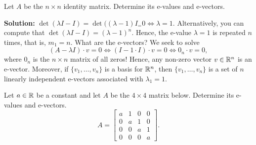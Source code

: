 \begin{example}
\label{ex:Eigen03} Let $A$ be the $n \times n$ identity matrix. Determine its e-values and e-vectors.
\end{example}

\textbf{Solution:} $\det(\lambda I - I)=\det((\lambda-1)I_=0 \iff \lambda = 1.$ Alternatively, you can compute that $\det(\lambda I - I) = (\lambda -1)^n.$ Hence, the e-value $\lambda=1$ is repeated $n$ times, that is, $m_1=n$. What are the e-vectors? We seek to solve 
$$(A-\lambda I)\cdot v = 0 \iff (I - 1\cdot I) \cdot v = 0 \iff 0_n \cdot v=0, $$
where $0_n$ is the $n \times n$ matrix of all zeros! Hence, any non-zero vector $v\in \mathbb R^n$ is an e-vector. Moreover, if $\{v_1, \ldots, v_n \}$ is a basis for $\mathbb R^n$, then $\{v_1, \ldots, v_n \}$ is a set of $n$ linearly independent e-vectors associated with $\lambda_1=1$.
\Qed

\begin{example}
\label{ex:Eigen04} Let $a\in \mathbb R$ be a constant and let $A$ be the $4 \times 4$ matrix below. Determine its e-values and e-vectors.
$$A= \left[\begin{array}{cccc} a & 1 & 0 & 0\\
0 & a & 1 & 0\\
0& 0& a & 1\\
0& 0& 0 & a\end{array}\right]. $$
\end{example}

